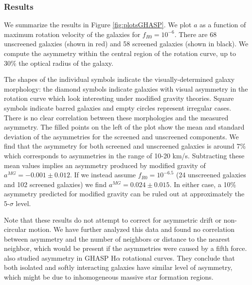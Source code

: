 \documentclass{emulateapj}
\newcommand{\ha}{H$\alpha$}
\begin{document}
% 


\subsubsection{Results}
We summarize the results in Figure \ref{fig:plotsGHASP}.  We plot  $a$
as a function of maximum rotation velocity of the galaxies for
$f_{R0}=10^{-6}$. There are 68 unscreened galaxies
(shown in red) and 58 screened galaxies (shown in black).
We compute the asymmetry within the central region of the rotation curve,
up to 30\% the optical radius of the galaxy.

The shapes of the individual symbols indicate the visually-determined galaxy
morphology: the diamond symbols indicate
galaxies with visual asymmetry in the rotation curve which look interesting
under modified gravity theories. Square symbols indicate barred
galaxies and empty circles represent irregular cases.
There is no clear correlation between these morphologies and the
measured asymmetry.   The filled points on the left of the plot show the
mean and standard deviation of the asymmetries for the screened and unscreened
components. We find that the asymmetry for both
screened and unscreened galaxies is around 7\% which corresponds to
asymmetries in the range of 10-20 km/s.
Subtracting these mean values implies an asymmetry produced by modified
gravity of $a^{MG}=-0.001\pm 0.012$.
If we instead assume $f_{R0}=10^{-6.5}$ (24 unscreened galaxies and 102
screened galaxies) we find $a^{MG}=0.024\pm 0.015$.
In either case, a 10\% asymmetry predicted for modified gravity can be
ruled out at approximately the 5-$\sigma$ level.

Note that
these results do not attempt to correct for asymmetric drift or non-circular
motion.  We have further analyzed this data and found no correlation between
asymmetry and the number of neighbors or distance to the nearest neighbor,
which would be present if the asymmetries were caused by a fifth force.
\citet{garrido05} also studied asymmetry in
GHASP \ha{} rotational curves. They conclude that both isolated and softly
interacting galaxies have similar level of asymmetry, which might be due to
inhomogeneous massive star formation regions.
\end{document}
